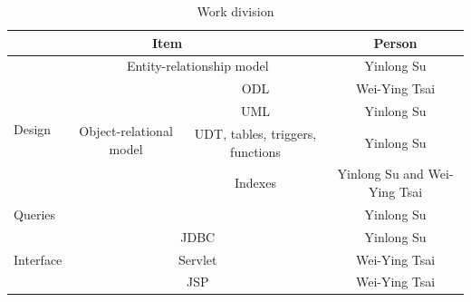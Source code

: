 \documentclass[11pt]{article}
\begin{document}
\begin{table}[!htbp]
\centering
\label{tab:workdivision}
\caption{Work division}
\begin{tabular}{|l|c|c||c|}
\hline
\multicolumn{3}{|c||}{Item} & Person \\
\hline
\multirow{5}{*}{Design} & \multicolumn{2}{c||}{Entity-relationship model} & Yinlong Su \\
\cline{2-4}
& \multirow{4}{*}{Object-relational model} & ODL & Wei-Ying Tsai \\
\cline{3-4}
& & UML & Yinlong Su \\
\cline{3-4}
& & UDT, tables, triggers, functions & Yinlong Su \\
\cline{3-4}
& & Indexes & Yinlong Su and Wei-Ying Tsai \\
\hline
\multicolumn{3}{|l||}{Queries} & Yinlong Su \\
\hline
\multirow{3}{*}{Interface} & \multicolumn{2}{c||}{JDBC} & Yinlong Su \\
\cline{2-4}
& \multicolumn{2}{c||}{Servlet} & Wei-Ying Tsai \\
\cline{2-4}
& \multicolumn{2}{c||}{JSP} & Wei-Ying Tsai \\
\hline
\end{tabular}
\end{table}
\end{document}
